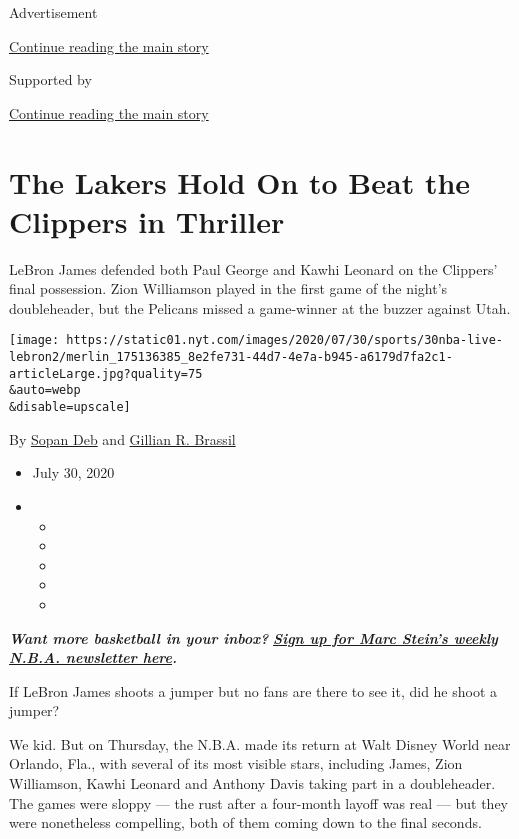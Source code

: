 Advertisement

\protect\hyperlink{after-top}{Continue reading the main story}

Supported by

\protect\hyperlink{after-sponsor}{Continue reading the main story}

\hypertarget{the-lakers-hold-on-to-beat-the-clippers-in-thriller}{%
\section{The Lakers Hold On to Beat the Clippers in
Thriller}\label{the-lakers-hold-on-to-beat-the-clippers-in-thriller}}

LeBron James defended both Paul George and Kawhi Leonard on the
Clippers' final possession. Zion Williamson played in the first game of
the night's doubleheader, but the Pelicans missed a game-winner at the
buzzer against Utah.

\texttt{[image: https://static01.nyt.com/images/2020/07/30/sports/30nba-live-lebron2/merlin\_175136385\_8e2fe731-44d7-4e7a-b945-a6179d7fa2c1-articleLarge.jpg?quality=75\\\&auto=webp\\\&disable=upscale]}

By \href{https://www.nytimes.com/by/sopan-deb}{Sopan Deb} and
\href{https://www.nytimes.com/by/gillian-r--brassil}{Gillian R. Brassil}

\begin{itemize}
\item
  July 30, 2020
\item
  \begin{itemize}
  \item
  \item
  \item
  \item
  \item
  \end{itemize}
\end{itemize}

\emph{\textbf{Want more basketball in your inbox?}}
\textbf{\href{https://www.nytimes.com/newsletters/marc-stein}{\emph{Sign
up for Marc Stein's weekly N.B.A. newsletter here}}\emph{.}}

If LeBron James shoots a jumper but no fans are there to see it, did he
shoot a jumper?

We kid. But on Thursday, the N.B.A. made its return at Walt Disney World
near Orlando, Fla., with several of its most visible stars, including
James, Zion Williamson, Kawhi Leonard and Anthony Davis taking part in a
doubleheader. The games were sloppy --- the rust after a four-month
layoff was real --- but they were nonetheless compelling, both of them
coming down to the final seconds.

